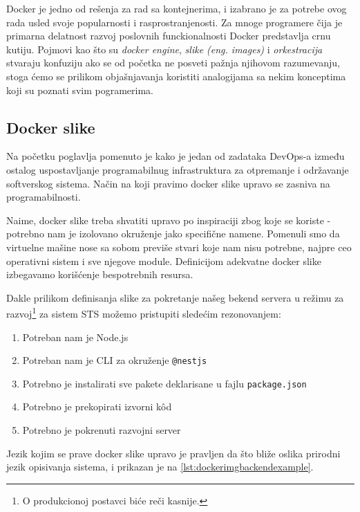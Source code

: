 \documentclass[12pt,oneside]{memoir}
\begin{document}
Docker je jedno od rešenja za rad sa kontejnerima, i izabrano je za potrebe ovog rada usled svoje popularnosti i rasprostranjenosti. Za mnoge programere čija je primarna delatnost razvoj poslovnih funckionalnosti Docker predstavlja crnu kutiju. Pojmovi kao što su \textit{docker engine}, \textit{slike (eng. images)} i \textit{orkestracija} stvaraju konfuziju ako se od početka ne posveti pažnja njihovom razumevanju, stoga ćemo se prilikom objašnjavanja koristiti analogijama sa nekim konceptima koji su poznati svim pogramerima.

\subsection{Docker slike}

Na početku poglavlja pomenuto je kako je jedan od zadataka DevOps-a između ostalog uspostavljanje programabilnug infrastruktura za otpremanje i održavanje softverskog sistema. Način na koji pravimo docker slike upravo se zasniva na programabilnosti. 

Naime, docker slike treba shvatiti upravo po inspiraciji zbog koje se koriste - potrebno nam je izolovano okruženje jako specifične namene. Pomenuli smo da virtuelne mašine nose sa sobom previše stvari koje nam nisu potrebne, najpre ceo operativni sistem i sve njegove module. Definicijom adekvatne docker slike izbegavamo korišćenje bespotrebnih resursa. 

Dakle prilikom definisanja slike za pokretanje našeg bekend servera u režimu za razvoj\footnote{O produkcionoj postavci biće reči kasnije.} za sistem STS možemo pristupiti sledećim rezonovanjem:

\begin{enumerate}
    \item Potreban nam je Node.js
    \item Potreban nam je CLI za okruženje \verb|@nestjs|
    \item Potrebno je instalirati sve pakete deklarisane u fajlu \verb|package.json|
    \item Potrebno je prekopirati izvorni k\^{o}d
    \item Potrebno je pokrenuti razvojni server
\end{enumerate}

Jezik kojim se prave docker slike upravo je pravljen da što bliže oslika prirodni jezik opisivanja sistema, i prikazan je na \ref{lst:dockerimgbackendexample}.
\end{document}
